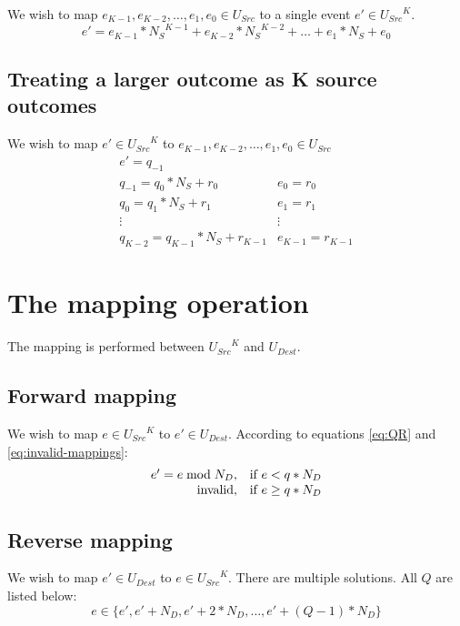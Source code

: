 \documentclass[a4paper,12pt]{article}
\begin{document}
We wish to map
\(e_{K-1}, e_{K-2}, \dots, e_1, e_0 \in U_{Src}\)
to a single event \(e' \in {U_{Src}}^K\).
\begin{equation}
e' = e_{K-1} * {N_S}^{K-1} + e_{K-2} * {N_S}^{K-2} + \dots + e_1 * N_S + e_0
\end{equation}

\subsection{Treating a larger outcome as K source outcomes}

We wish to map \(e' \in {U_{Src}}^K\) to
\(e_{K-1}, e_{K-2}, \dots, e_1, e_0 \in U_{Src}\)
\begin{equation}
\begin{array}{l|l}
e' = q_{-1} & \\
q_{-1} = q_0 * N_S + r_0 & e_0 = r_0\\
q_0 = q_1 * N_S + r_1 & e_1 = r_1\\
\vdots & \vdots \\
q_{K-2} = q_{K-1} * N_S + r_{K-1} & e_{K-1} = r_{K-1}
\end{array}
\end{equation}


\section{The mapping operation}

The mapping is performed between \({U_{Src}}^K\) and \(U_{Dest}\).

\subsection{Forward mapping}
We wish to map \(e \in {U_{Src}}^K\) to \(e' \in U_{Dest}\).
According to equations \ref{eq:QR} and \ref{eq:invalid-mappings}:
\begin{equation}
\begin{array}{r l}
e' = e \bmod N_D, & \text{if } e < q * N_D \\
\text{invalid}, & \text{if } e \geq q * N_D
\end{array}
\end{equation}

\subsection{Reverse mapping}
We wish to map \(e' \in U_{Dest}\) to \(e \in {U_{Src}}^K\).
There are multiple solutions. All \(Q\) are listed below:
\begin{equation}
e \in \{ e', e' + N_D, e' + 2*N_D, \dots, e' + (Q-1) * N_D \}
\end{equation}
\end{document}
